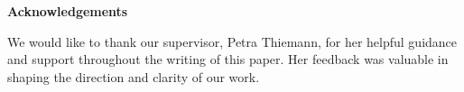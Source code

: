 \documentclass[12pt, a4paper]{article}
\begin{document}
\newpage

\begin{center}
    \textbf{Acknowledgements}
\end{center}
We would like to thank our supervisor, Petra Thiemann, for her helpful guidance and support throughout the writing of this paper. 
Her feedback was valuable in shaping the direction and clarity of our work.

\newpage

\begingroup
    \tableofcontents
\endgroup
\thispagestyle{empty}

\newpage
\setcounter{page}{1}










\newpage
\begin{flushleft}
    \renewcommand{\baselinestretch}{1.1}
    \small
    \titleformat{\section}{\normalfont\huge\bfseries}{\thesection}{1em}{} 
    
\end{flushleft}

\newpage
\appendix
\setcounter{page}{1} %







\newpage
{} %
\renewcommand{\thesection}{\arabic{section}} %
\setcounter{section}{0} %



\end{document}
